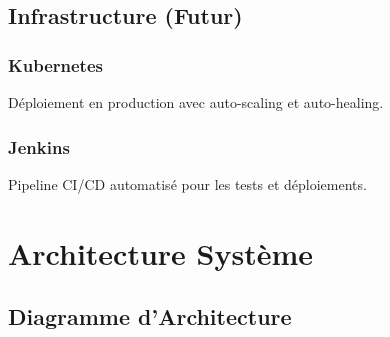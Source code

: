 \documentclass[12pt,a4paper,twoside]{report}
\begin{document}
\section{Infrastructure (Futur)}

\subsection{Kubernetes}
Déploiement en production avec auto-scaling et auto-healing.

\subsection{Jenkins}
Pipeline CI/CD automatisé pour les tests et déploiements.

\chapter{Architecture Système}

\section{Diagramme d'Architecture}
\end{document}
